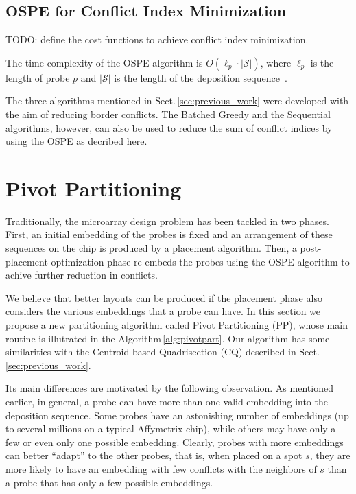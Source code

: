 \documentclass{llncs}
\begin{document}
\subsection{OSPE for Conflict Index Minimization}
\label{sec:ospe_ci}

TODO: define the cost functions to achieve conflict index minimization.

The time complexity of the OSPE algorithm is $O(\ell_p \cdot |\mathcal{S}|)$,
where $\ell_p$ is the length of probe $p$ and $|\mathcal{S}|$ is the length of
the deposition sequence~\cite{KAHNG02}.

The three algorithms mentioned in Sect.\,\ref{sec:previous_work} were developed with
the aim of reducing border conflicts. The Batched Greedy and the Sequential algorithms,
however, can also be used to reduce the sum of conflict indices by using the OSPE as
decribed here.

\section{Pivot Partitioning}
\label{sec:pivotpart}

Traditionally, the microarray design problem has been tackled in two phases. First,
an initial embedding of the probes is fixed and an arrangement of these sequences
on the chip is produced by a placement algorithm. Then, a post-placement optimization
phase re-embeds the probes using the OSPE algorithm to achive further reduction in
conflicts.

We believe that better layouts can be produced if the placement phase also considers
the various embeddings that a probe can have. In this section we propose a new
partitioning algorithm called Pivot Partitioning (PP), whose main routine is
illutrated in the Algorithm\,\ref{alg:pivotpart}. Our algorithm
has some similarities with the Centroid-based Quadrisection (CQ) described
in Sect.\,\ref{sec:previous_work}.

Its main differences are motivated by the following observation.
As mentioned earlier, in general, a probe can have more than one valid embedding
into the deposition sequence. Some probes have an
astonishing number of embeddings (up to several millions on a typical
Affymetrix chip), while others may have only a few or even only one possible embedding.
Clearly, probes with more embeddings can better
``adapt'' to the other probes, that is, when placed on a spot $s$, they are more likely
to have an embedding with few conflicts with the neighbors of $s$ than a probe that has
only a few possible embeddings.
\end{document}
